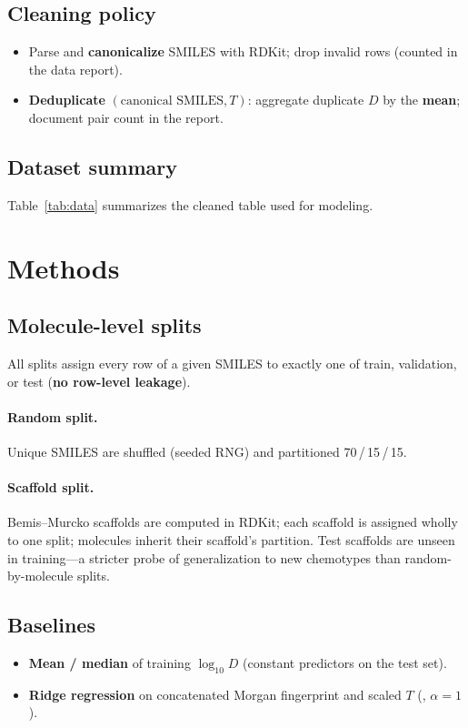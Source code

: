 \documentclass[11pt,a4paper]{article}
\begin{document}
\subsection{Cleaning policy}
\begin{itemize}
  \item Parse and \textbf{canonicalize} SMILES with RDKit; drop invalid rows (counted in the data report).
  \item \textbf{Deduplicate} $(\text{canonical SMILES}, T)$: aggregate duplicate $D$ by the \textbf{mean}; document pair count in the report.
\end{itemize}

\subsection{Dataset summary}
Table~\ref{tab:data} summarizes the cleaned table used for modeling.

\begin{table}[ht]
  \centering
  \caption{Cleaned dataset (after deduplication).}
  \label{tab:data}
  \GeneratedDataTable
\end{table}

\section{Methods}
\subsection{Molecule-level splits}
All splits assign every row of a given SMILES to exactly one of train, validation, or test (\textbf{no row-level leakage}).

\paragraph{Random split.} Unique SMILES are shuffled (seeded RNG) and partitioned 70\,/\,15\,/\,15.

\paragraph{Scaffold split.} Bemis--Murcko scaffolds are computed in RDKit; each scaffold is assigned wholly to one split; molecules inherit their scaffold's partition. Test scaffolds are unseen in training---a stricter probe of generalization to new chemotypes than random-by-molecule splits.

\subsection{Baselines}
\begin{itemize}
  \item \textbf{Mean / median} of training $\log_{10} D$ (constant predictors on the test set).
  \item \textbf{Ridge regression} on concatenated Morgan fingerprint and scaled $T$ (, $\alpha=1$).
\end{itemize}
\end{document}
